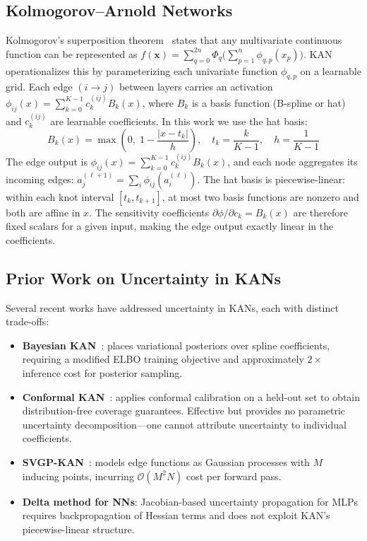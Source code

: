 \documentclass{article}
\begin{document}
\subsection{Kolmogorov--Arnold Networks}
\label{sec:kan}

Kolmogorov's superposition theorem~\citep{kolmogorov1957} states that any
multivariate continuous function can be represented as
$f(\mathbf{x}) = \sum_{q=0}^{2n} \Phi_q\!\bigl(\sum_{p=1}^{n}
\phi_{q,p}(x_p)\bigr)$.  KAN~\citep{liu2024kan} operationalizes this by
parameterizing each univariate function $\phi_{q,p}$ on a learnable grid.
Each edge $(i \to j)$ between layers carries an activation
$\phi_{ij}(x) = \sum_{k=0}^{K-1} c_k^{(ij)} B_k(x)$, where $B_k$ is a
basis function (B-spline or hat) and $c_k^{(ij)}$ are learnable coefficients.
In this work we use the hat basis:
\begin{equation}
  B_k(x) = \max\!\left(0,\; 1 - \frac{|x - t_k|}{h}\right), \quad
  t_k = \frac{k}{K-1}, \quad h = \frac{1}{K-1}
  \label{eq:hat}
\end{equation}
The edge output is $\phi_{ij}(x) = \sum_{k=0}^{K-1} c_k^{(ij)} B_k(x)$,
and each node aggregates its incoming edges:
$a_j^{(\ell+1)} = \sum_{i} \phi_{ij}(a_i^{(\ell)})$.  The hat basis is
piecewise-linear: within each knot interval $[t_k, t_{k+1}]$, at most two
basis functions are nonzero and both are affine in $x$.  The sensitivity
coefficients $\partial\phi/\partial c_k = B_k(x)$ are therefore fixed scalars
for a given input, making the edge output exactly linear in the coefficients.

\subsection{Prior Work on Uncertainty in KANs}
\label{sec:prior}

Several recent works have addressed uncertainty in KANs, each with distinct
trade-offs:

\begin{itemize}
  \item \textbf{Bayesian KAN}~\citep{hassan2024bayeskan}: places variational
        posteriors over spline coefficients, requiring a modified ELBO training
        objective and approximately $2\times$ inference cost for posterior
        sampling.
  \item \textbf{Conformal KAN}~\citep{mollaali2025conformal}: applies
        conformal calibration on a held-out set to obtain distribution-free
        coverage guarantees.  Effective but provides no parametric uncertainty
        decomposition---one cannot attribute uncertainty to individual
        coefficients.
  \item \textbf{SVGP-KAN}~\citep{ju2025svgpkan}: models edge functions as
        Gaussian processes with $M$ inducing points, incurring
        $\mathcal{O}(M^2 N)$ cost per forward pass.
  \item \textbf{Delta method for NNs}: Jacobian-based uncertainty propagation
        for MLPs requires backpropagation of Hessian terms and does not exploit
        KAN's piecewise-linear structure.
\end{itemize}
\end{document}
